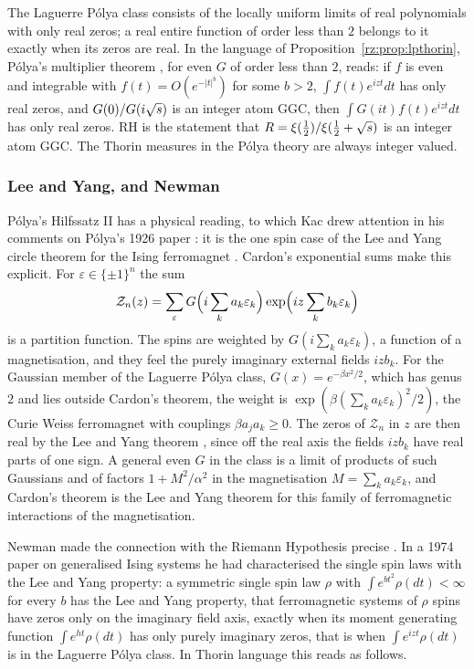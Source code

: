 The Laguerre P\'olya class consists of the locally uniform limits of real polynomials with only real zeros; a real entire function of order less than $2$ belongs to it exactly when its zeros are real. In the language of Proposition~\ref{rz:prop:lpthorin}, P\'olya's multiplier theorem \cite[Proposition~1]{Cardon2005}, for even $G$ of order less than $2$, reads: if $f$ is even and integrable with $f(t)=O(e^{-|t|^b})$ for some $b>2$, $\int f(t)e^{izt}dt$ has only real zeros, and $G(0)/G(i\sqrt{s})$ is an integer atom GGC, then $\int G(it)f(t)e^{izt}dt$ has only real zeros. RH is the statement that $R=\xi(\frac12)/\xi(\frac12+\sqrt{s})$ is an integer atom GGC. The Thorin measures in the P\'olya theory are always integer valued.

\subsubsection{Lee and Yang, and Newman}

P\'olya's Hilfssatz II has a physical reading, to which Kac drew attention in his comments on P\'olya's 1926 paper \cite[pp.~424 to 426]{Kac74}: it is the one spin case of the Lee and Yang circle theorem for the Ising ferromagnet \cite{LeeYang}. Cardon's exponential sums make this explicit. For $\varepsilon\in\{\pm1\}^n$ the sum
\[
\mathcal Z_n(z)=\sum_{\varepsilon}G\Bigl(i\sum_ka_k\varepsilon_k\Bigr)\exp\Bigl(iz\sum_kb_k\varepsilon_k\Bigr)
\]
is a partition function. The spins are weighted by $G(i\sum_ka_k\varepsilon_k)$, a function of a magnetisation, and they feel the purely imaginary external fields $izb_k$. For the Gaussian member of the Laguerre P\'olya class, $G(x)=e^{-\beta x^2/2}$, which has genus $2$ and lies outside Cardon's theorem, the weight is $\exp(\beta(\sum_ka_k\varepsilon_k)^2/2)$, the Curie Weiss ferromagnet with couplings $\beta a_ja_k\ge0$. The zeros of $\mathcal Z_n$ in $z$ are then real by the Lee and Yang theorem \cite{LeeYang}, since off the real axis the fields $izb_k$ have real parts of one sign. A general even $G$ in the class is a limit of products of such Gaussians and of factors $1+M^2/\alpha^2$ in the magnetisation $M=\sum_ka_k\varepsilon_k$, and Cardon's theorem is the Lee and Yang theorem for this family of ferromagnetic interactions of the magnetisation.

Newman made the connection with the Riemann Hypothesis precise \cite{Newman1976}. In a 1974 paper on generalised Ising systems \cite{Newman74} he had characterised the single spin laws with the Lee and Yang property: a symmetric single spin law $\rho$ with $\int e^{bt^2}\rho(dt)<\infty$ for every $b$ has the Lee and Yang property, that ferromagnetic systems of $\rho$ spins have zeros only on the imaginary field axis, exactly when its moment generating function $\int e^{ht}\rho(dt)$ has only purely imaginary zeros, that is when $\int e^{izt}\rho(dt)$ is in the Laguerre P\'olya class. In Thorin language this reads as follows.

